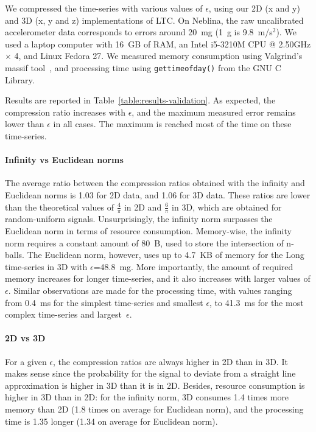 We compressed the time-series with various values of $\epsilon$, using
our 2D (x and y) and 3D (x, y and z) implementations of LTC. On
Neblina, the raw uncalibrated accelerometer data corresponds to errors
around 20~mg (1~g is 9.8~m/s$^2$). We used a
laptop computer with 16~GB of RAM, an Intel i5-3210M CPU @ 2.50GHz
$\times$ 4, and Linux Fedora 27. We measured memory consumption using
Valgrind's massif
tool~\cite{nethercote2006building},
and processing time using \texttt{gettimeofday()} from the GNU C
Library.

Results are reported in Table~\ref{table:results-validation}.
As expected, the compression ratio increases with $\epsilon$, and the
maximum measured error remains lower than $\epsilon$ in all cases. The
maximum is reached most of the time on these time-series.

\paragraph{Infinity vs Euclidean norms}
The average ratio between the compression ratios obtained with the infinity and
Euclidean norms is 1.03 for 2D data, and 1.06 for 3D data. These ratios are
lower than the theoretical values of $\frac{4}{\pi}$ in 2D and $\frac{6}{\pi}$
in 3D, which are obtained for random-uniform signals. Unsurprisingly, the
infinity norm surpasses the Euclidean norm in terms of resource consumption.
Memory-wise, the infinity norm requires a constant amount of 80~B, used to store
the intersection of n-balls. The Euclidean norm, however, uses up to 4.7~KB of
memory for the Long time-series in 3D with $\epsilon$=48.8~mg. More importantly,
the amount of required memory increases for longer time-series, and it also
increases with larger values of $\epsilon$. Similar observations are made for
the processing time, with values ranging from 0.4~ms for the simplest
time-series and smallest $\epsilon$, to 41.3~ms for the most complex time-series
and largest~$\epsilon$.

\paragraph{2D vs 3D}
For a given $\epsilon$, the compression
ratios are always higher in 2D than in 3D. It makes sense since the
probability for the signal to deviate from a straight line
approximation is higher in 3D than it is in 2D. Besides, resource
consumption is higher in 3D than in 2D: for the infinity norm, 3D
consumes 1.4 times more memory than 2D (1.8 times on average for
Euclidean norm), and the processing time is 1.35 longer (1.34 on
average for Euclidean norm).

